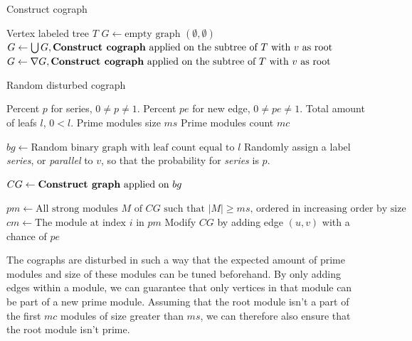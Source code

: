 \documentclass[a4paper]{article}
\begin{document}
\begin{algorithm}[H]
    \caption{Construct cograph}
   \begin{algorithmic}[1]
        \REQUIRE Vertex labeled tree $T$
        \ENDIF
        \STATE $G \leftarrow \text{empty graph $(\emptyset,\emptyset)$}$
                \STATE $G \leftarrow \bigcup G, \text{\textbf{Construct cograph} applied
                on the subtree of $T$ with $v$ as root} $
                \STATE $G \leftarrow \nabla G, \text{\textbf{Construct cograph} applied
                on the subtree of $T$ with $v$ as root}$
            \ENDIF
        \ENDFOR
    \end{algorithmic}
\end{algorithm}

\begin{algorithm}[H]
    \caption{Random disturbed cograph}
  \label{alg:RDCG}
  \begin{algorithmic}[1]
      \REQUIRE Percent $p$ for series, $0 \neq p \neq 1$.
      \REQUIRE Percent $pe$ for new  edge, $0 \neq pe \neq 1$.
      \REQUIRE Total amount of leafs $l$, $0 < l$.
      \REQUIRE Prime modules size $ms$
      \REQUIRE Prime modules count $mc$

      \STATE $bg \leftarrow \text{Random binary graph with leaf count equal to $l$}$
        \STATE Randomly assign a label  \textit{series}, or \textit{parallel} to $v$, so
        that the probability for \textit{series} is $p$.
      \ENDFOR

      \STATE $CG \leftarrow \text{\textbf{Construct graph} applied on $bg$}$

      \STATE $pm \leftarrow \text{All strong modules $M$ of $CG$ such that $|M| \geq ms$, ordered in increasing order by size}$
        \STATE $cm \leftarrow \text{The module at index $i$ in $pm$}$
            \STATE Modify $CG$ by adding edge $(u,v)$ with a chance of $pe$
        \ENDFOR
      \ENDFOR
  \end{algorithmic}
\end{algorithm}

The cographs are disturbed in such a way that the expected amount of prime
modules and size of these modules can be tuned beforehand. By only adding edges
within a module, we can guarantee that only vertices in that module can be part
of a new prime module.  Assuming that the root module isn't a part of the first
$mc$ modules of size greater than $ms$, we can therefore also ensure that the
root module isn't prime.
\end{document}
